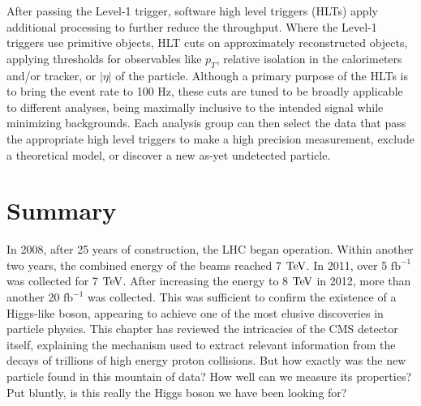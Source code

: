 After passing the Level-1 trigger, software high level triggers (HLTs) apply additional processing to further reduce the throughput. Where the Level-1 triggers use primitive objects, HLT cuts on approximately reconstructed objects, applying thresholds for observables like $p_T$, relative isolation in the calorimeters and/or tracker, or $|\eta|$ of the particle. Although a primary purpose of the HLTs is to bring the event rate to 100 Hz, these cuts are tuned to be broadly applicable to different analyses, being maximally inclusive to the intended signal while minimizing backgrounds. Each analysis group can then select the data that pass the appropriate high level triggers to make a high precision measurement, exclude a theoretical model, or discover a new as-yet undetected particle.

\section{Summary}
\label{sec:expt_summary}

In 2008, after 25 years of construction, the LHC began operation. Within another two years, the combined energy of the beams reached 7 $\rm{TeV}$. In 2011, over 5 $\mathrm{fb}^{-1}$ was collected for 7 $\rm{TeV}$. After increasing the energy to 8 $\rm{TeV}$ in 2012, more than another 20 $\mathrm{fb}^{-1}$ was collected. This was sufficient to confirm the existence of a Higgs-like boson, appearing to achieve one of the most elusive discoveries in particle physics. This chapter has reviewed the intricacies of the CMS detector itself, explaining the mechanism used to extract relevant information from the decays of trillions of high energy proton collisions. But how exactly was the new particle found in this mountain of data? How well can we measure its properties? Put bluntly, is this really the Higgs boson we have been looking for?